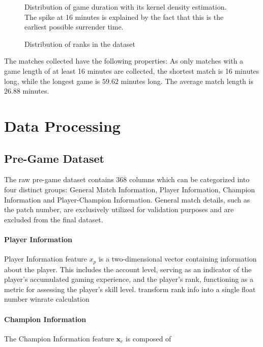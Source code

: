 \documentclass[12pt, a4paper, headinclude, twoside, plainheadsepline, open=right, numbers=noenddot, hidelinks, toc=listof, toc=bibliography]{scrreprt}
\begin{document}
\begin{figure}

\caption{Distribution of game duration with its kernel density estimation. The spike at 16 minutes is explained by the fact that this is the earliest possible surrender time.}
\label{fig:gameDuration}
\end{figure}


\begin{figure}
\resizebox{\textwidth}{!}{}
\caption{Distribution of ranks in the dataset}
\label{fig:tier}
\end{figure}

The matches collected have the following properties: 
As only matches with a game length of at least 16 minutes are collected, the shortest match is 16 minutes long, while the longest game is $59.62$ minutes long.
The average match length is $26.88$ minutes.


\section{Data Processing}
\label{sec:data_processing}

\subsection{Pre-Game Dataset}
\label{ssec:pre_game_data}
The raw pre-game dataset contains $368$ columns which can be categorized into four distinct groups: General Match Information, Player Information, Champion Information and Player-Champion Information.
General match details, such as the patch number, are exclusively utilized for validation purposes and are excluded from the final dataset.
\paragraph{Player Information}
Player Information feature $x_p$ is a two-dimensional vector containing information about the player. This includes the account level, serving as an indicator of the player's accumulated gaming experience, and the player's rank, functioning as a metric for assessing the player's skill level.
transform rank info into a single float number
winrate calculation

\paragraph{Champion Information}
The Champion Information feature $\mathbf{x}_c$ is composed of 
\end{document}
